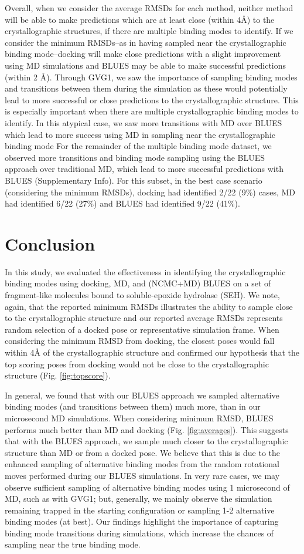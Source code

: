 Overall, when we consider the average RMSDs for each method, neither method will be able to make predictions which are at least close (within 4{\AA}) to the crystallographic structures, if there are multiple binding modes to identify.
If we consider the minimum RMSDs--as in having sampled near the crystallographic binding mode--docking will make close predictions with a slight improvement using MD simulations and BLUES may be able to make successful predictions (within 2 {\AA}).
Through GVG1, we saw the importance of sampling binding modes and transitions between them during the simulation as these would potentially lead to more successful or close predictions to the crystallographic structure.
This is especially important when there are multiple crystallographic binding modes to identify.
In this atypical case, we saw more transitions with MD over BLUES which lead to more success using MD in sampling near the crystallographic binding mode
For the remainder of the multiple binding mode dataset, we observed more transitions and binding mode sampling using the BLUES approach over traditional MD, which lead to more successful predictions with BLUES (Supplementary Info).
For this subset, in the best case scenario (considering the minimum RMSDs), docking had identified 2/22 (9\%) cases, MD had identified 6/22 (27\%) and BLUES had identified 9/22 (41\%).

\section{Conclusion}
In this study, we evaluated the effectiveness in identifying the crystallographic binding modes using docking, MD, and (NCMC+MD) BLUES on a set of fragment-like molecules bound to soluble-epoxide hydrolase (SEH).
We note, again, that the reported minimum RMSDs illustrates the ability to sample close to the crystallographic structure and our reported average RMSDs represents random selection of a docked pose or representative simulation frame.
When considering the minimum RMSD from docking, the closest poses would fall within 4{\AA} of the crystallographic structure and confirmed our hypothesis that the top scoring poses from docking would not be close to the crystallographic structure (Fig. \ref{fig:topscore}).

In general, we found that with our BLUES approach we sampled alternative binding modes (and transitions between them) much more, than in our microsecond MD simulations.
When considering minimum RMSD, BLUES performs much better than MD and docking (Fig. \ref{fig:averages}).
This suggests that with the BLUES approach, we sample much closer to the crystallographic structure than MD or from a docked pose.
We believe that this is due to the enhanced sampling of alternative binding modes from the random rotational moves performed during our BLUES simulations.
In very rare cases, we may observe sufficient sampling of alternative binding modes using 1 microsecond of MD, such as with GVG1; but, generally, we mainly observe the simulation remaining trapped in the starting configuration or sampling 1-2 alternative binding modes (at best).
Our findings highlight the importance of capturing binding mode transitions during simulations, which increase the chances of sampling near the true binding mode.

